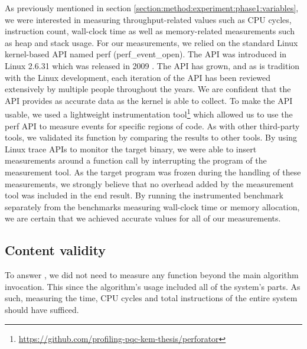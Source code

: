 

As previously mentioned in section \ref{section:method:experiment:phase1:variables}, we were interested in measuring throughput-related values such as CPU cycles, instruction count, wall-clock time as well as memory-related measurements such as heap and stack usage. For our measurements, we relied on the standard Linux kernel-based API named perf (perf\_event\_open). The API was introduced in Linux 2.6.31 which was released in 2009 \cite{linux:perf-released}. The API has grown, and as is tradition with the Linux development, each iteration of the API has been reviewed extensively by multiple people throughout the years. We are confident that the API provides as accurate data as the kernel is able to collect. To make the API usable, we used a lightweight instrumentation tool\footnote{\url{https://github.com/profiling-pqc-kem-thesis/perforator}} which allowed us to use the perf API to measure events for specific regions of code. As with other third-party tools, we validated its function by comparing the results to other tools. By using Linux trace APIs to monitor the target binary, we were able to insert measurements around a function call by interrupting the program of the measurement tool. As the target program was frozen during the handling of these measurements, we strongly believe that no overhead added by the measurement tool was included in the end result. By running the instrumented benchmark separately from the benchmarks measuring wall-clock time or memory allocation, we are certain that we achieved accurate values for all of our measurements.

\subsection{Content validity}


To answer , we did not need to measure any function beyond the main algorithm invocation. This since the algorithm's usage included all of the system's parts. As such, measuring the time, CPU cycles and total instructions of the entire system should have sufficed.

